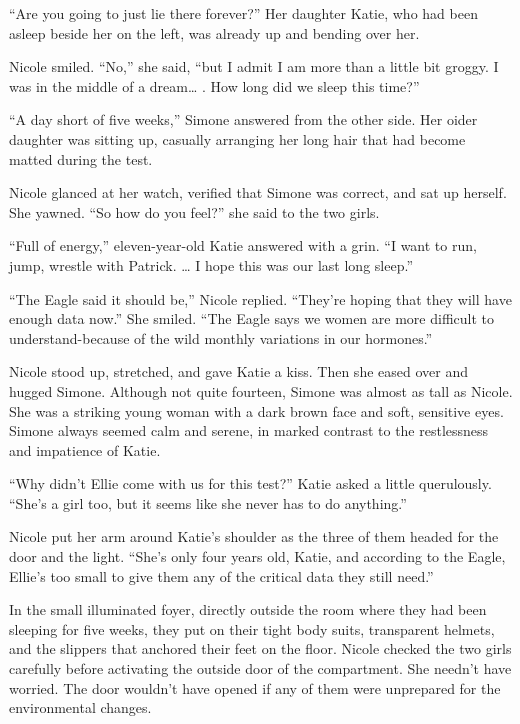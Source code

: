 \documentclass[]{article}
\begin{document}
{“Are you going to just lie there forever?” Her daughter Katie, who had been asleep beside her on the left, was already up and bending over her.

Nicole smiled. “No,” she said, “but I admit I am more than a little bit groggy. I was in the middle of a dream… . How long did we sleep this time?”

“A day short of five weeks,” Simone answered from the other side. Her oider daughter was sitting up, casually arranging her long hair that had become matted during the test.

Nicole glanced at her watch, verified that Simone was correct, and sat up herself. She yawned. “So how do you feel?” she said to the two girls.

“Full of energy,” eleven-year-old Katie answered with a grin. “I want to run, jump, wrestle with Patrick. … I hope this was our last long sleep.”

“The Eagle said it should be,” Nicole replied. “They’re hoping that they will have enough data now.” She smiled. “The Eagle says we women are more difficult to understand-because of the wild monthly variations in our hormones.”

Nicole stood up, stretched, and gave Katie a kiss. Then she eased over and hugged Simone. Although not quite fourteen, Simone was almost as tall as Nicole. She was a striking young woman with a dark brown face and soft, sensitive eyes. Simone always seemed calm and serene, in marked contrast to the restlessness and impatience of Katie.

“Why didn’t Ellie come with us for this test?” Katie asked a little querulously. “She’s a girl too, but it seems like she never has to do anything.”

Nicole put her arm around Katie’s shoulder as the three of them headed for the door and the light. “She’s only four years old, Katie, and according to the Eagle, Ellie’s too small to give them any of the critical data they still need.”

In the small illuminated foyer, directly outside the room where they had been sleeping for five weeks, they put on their tight body suits, transparent helmets, and the slippers that anchored their feet on the floor. Nicole checked the two girls carefully before activating the outside door of the compartment. She needn’t have worried. The door wouldn’t have opened if any of them were unprepared for the environmental changes.

}
\end{document}
